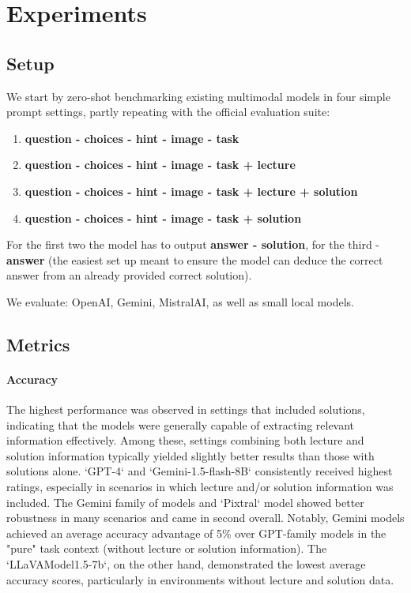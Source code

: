 \documentclass{article}
\begin{document}
\section{Experiments}
\label{experiments}

\subsection{Setup}
We start by zero-shot benchmarking existing multimodal models in four simple prompt settings, partly repeating with the official evaluation suite:
\begin{enumerate}
	\item \textbf{question - choices - hint - image - task}
	\item \textbf{question - choices - hint - image - task + lecture}
	\item \textbf{question - choices - hint - image - task + lecture + solution}
	\item \textbf{question - choices - hint - image - task + solution}
\end{enumerate}

For the first two the model has to output \textbf{answer - solution}, for the third - \textbf{answer} (the easiest set up meant to ensure the model can deduce the correct answer from an already provided correct solution). 

We evaluate: OpenAI, Gemini, MistralAI, as well as small local models. %

\subsection{Metrics}
\paragraph{Accuracy}
The highest performance was observed in settings that included solutions, indicating that the models were generally capable of extracting relevant information effectively. Among these, settings combining both lecture and solution information typically yielded slightly better results than those with solutions alone. `GPT-4` and `Gemini-1.5-flash-8B` consistently received highest ratings, especially in scenarios in which lecture and/or solution information was included. The Gemini family of models and  `Pixtral` model showed better robustness in many scenarios and came in second overall. Notably, Gemini models achieved an average accuracy advantage of 5\% over GPT-family models in the "pure" task context (without lecture or solution information). The `LLaVAModel1.5-7b`, on the other hand, demonstrated the lowest average accuracy scores, particularly in environments without lecture and solution data.
\end{document}

